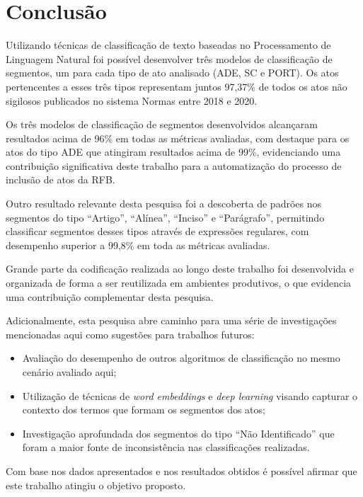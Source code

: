 \section{Conclusão}

Utilizando técnicas de classificação de texto baseadas no Processamento de Linguagem Natural foi possível desenvolver três modelos de classificação de segmentos, um para cada tipo de ato analisado (ADE, SC e PORT). Os atos pertencentes a esses três tipos representam juntos 97,37\% de todos os atos não sigilosos publicados no sistema Normas entre 2018 e 2020.

Os três modelos de classificação de segmentos desenvolvidos alcançaram resultados acima de 96\% em todas as métricas avaliadas, com destaque para os atos do tipo ADE que atingiram resultados acima de 99\%, evidenciando uma contribuição significativa deste trabalho para a automatização do processo de inclusão de atos da RFB.

Outro resultado relevante desta pesquisa foi a descoberta de padrões nos segmentos do tipo ``Artigo'', ``Alínea'', ``Inciso'' e ``Parágrafo'', permitindo classificar segmentos desses tipos através de expressões regulares, com desempenho superior a 99,8\% em toda as métricas avaliadas. 

Grande parte da codificação realizada ao longo deste trabalho foi desenvolvida e organizada de forma a ser reutilizada em ambientes produtivos, o que evidencia uma contribuição complementar desta pesquisa.

Adicionalmente, esta pesquisa abre caminho para uma série de investigações mencionadas aqui como sugestões para trabalhos futuros: 
\begin{itemize}
	\item Avaliação do desempenho de outros algoritmos de classificação no mesmo cenário avaliado aqui;
	\item Utilização de técnicas de \textit{word embeddings} e \textit{deep learning} visando capturar o contexto dos termos que formam os segmentos dos atos;
	\item Investigação aprofundada dos segmentos do tipo ``Não Identificado'' que foram a maior fonte de inconsistência nas classificações realizadas.
\end{itemize}

Com base nos dados apresentados e nos resultados obtidos é possível afirmar que este trabalho atingiu o objetivo proposto.


\begin{figure}
\label{fig:fake}
\end{figure}